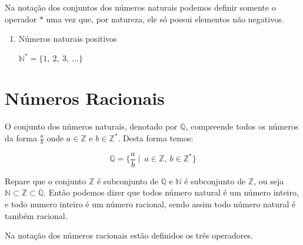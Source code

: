 \documentclass[]{book}
\begin{document}
Na notação dos conjuntos dos números naturais podemos definir somente o
operador \(*\) uma vez que, por natureza, ele só possui elementos não
negativos.

\begin{enumerate}
\def\labelenumi{\arabic{enumi}.}
\item
  Números naturais positivos

  \(\mathbb{N}^{*} = \{ 1,\ 2,\ 3,\ ... \}\)
\end{enumerate}

\section{Números Racionais}\label{numeros-racionais}

O conjunto dos números naturais, denotado por \(\mathbb{Q}\), compreende
todos os números da forma \(\frac{a}{b}\) onde \(a \in \mathbb{Z}\) e
\(b \in \mathbb{Z}^{*}\). Desta forma temos:

\[\mathbb{Q} = \{ \frac{a}{b} \mid \ a \in \mathbb{Z},\ b \in \mathbb{Z}^{*} \}\]

Repare que o conjunto \(\mathbb{Z}\) é subconjunto de \(\mathbb{Q}\) e
\(\mathbb{N}\) é subconjunto de \(\mathbb{Z}\), ou seja
\(\mathbb{N} \subset \mathbb{Z} \subset \mathbb{Q}\). Então podemos
dizer que todos número natural é um número inteiro, e todo numero
inteiro é um número racional, sendo assim todo número natural é também
racional.

Na notação dos números racionais estão definidos os três operadores.
\end{document}
